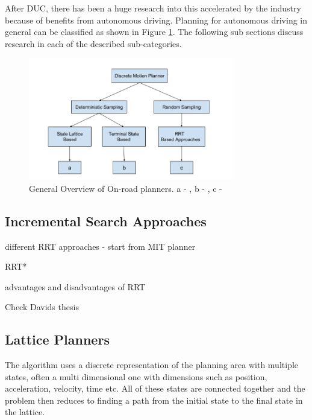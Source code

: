 After DUC, there has been a huge research into this accelerated by the industry because of benefits from autonomous driving. Planning for autonomous driving in general can be classified as shown in Figure \ref{related_work_classification}. The following sub sections discuss research in each of the described sub-categories. 

\begin{figure}[H]
	\centering
	\includegraphics[width=0.8\textwidth]{Images/related_work/planning_division.png}
	\caption{General Overview of On-road planners. a - \cite{cmu_parallel_thesis}  \cite{diss_shui_phd_thesis} \cite{traj_planner_optimization} \cite{lattice_Gu_Tiyanu} \cite{unit_A_star} , b - \cite{kolski_thesis} \cite{real_time_traj_plan_article} \cite{darpa_urban_challenge}, c -\cite{rrt_star} \cite{rrt_urban_driv} \cite{mit_rrt}
	}
	\label{related_work_classification}
\end{figure}

\subsection{Incremental Search Approaches}
\label{rw_incremental_search}

different RRT approaches - start from MIT planner

RRT*

advantages and disadvantages of RRT

Check Davids thesis

\subsection{Lattice Planners}
\label{rw_lattice_planners}
The algorithm uses a discrete representation of the planning area with multiple states, often a multi dimensional one with dimensions such as position, acceleration, velocity, time etc. All of these states are connected together and the problem then reduces to finding a path from the initial state to the final state in the lattice. 

